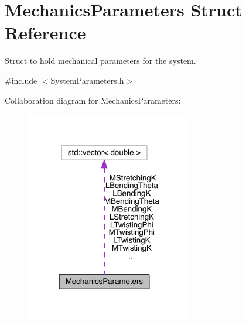\hypertarget{structMechanicsParameters}{\section{Mechanics\+Parameters Struct Reference}
\label{structMechanicsParameters}
}


Struct to hold mechanical parameters for the system.  




{\ttfamily \#include $<$System\+Parameters.\+h$>$}



Collaboration diagram for Mechanics\+Parameters\+:\nopagebreak
\begin{figure}[H]
\begin{center}
\leavevmode
\includegraphics[width=208pt]{structMechanicsParameters__coll__graph}
\end{center}
\end{figure}
